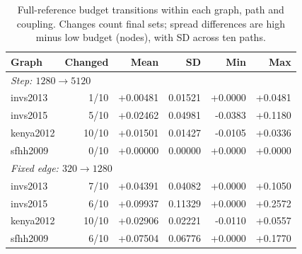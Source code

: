 \begin{table}[htbp]
\caption{Full-reference budget transitions within each graph, path and coupling. Changes count final sets; spread differences are high minus low budget (nodes), with SD across ten paths.}\label{tab:hist-transitions}
\centering\begin{tabular}{lrrrrr}
\toprule
Graph & Changed & Mean & SD & Min & Max\\
\midrule
\multicolumn{6}{l}{\textit{Step: $1280\to5120$}}\\
invs2013 & 1/10 & +0.00481 & 0.01521 & +0.0000 & +0.0481\\
invs2015 & 5/10 & +0.02462 & 0.04981 & -0.0383 & +0.1180\\
kenya2012 & 10/10 & +0.01501 & 0.01427 & -0.0105 & +0.0336\\
sfhh2009 & 0/10 & +0.00000 & 0.00000 & +0.0000 & +0.0000\\
\multicolumn{6}{l}{\textit{Fixed edge: $320\to1280$}}\\
invs2013 & 7/10 & +0.04391 & 0.04082 & +0.0000 & +0.1050\\
invs2015 & 6/10 & +0.09937 & 0.11329 & +0.0000 & +0.2572\\
kenya2012 & 10/10 & +0.02906 & 0.02221 & -0.0110 & +0.0557\\
sfhh2009 & 6/10 & +0.07504 & 0.06776 & +0.0000 & +0.1770\\
\bottomrule
\end{tabular}
\end{table}
